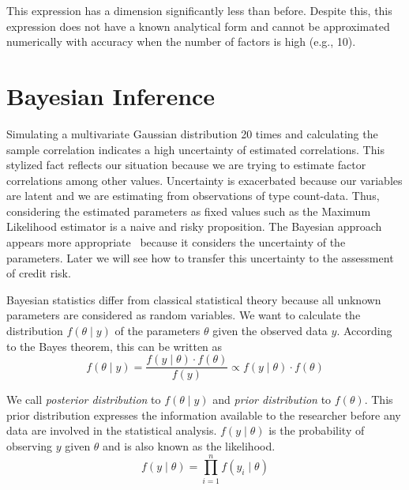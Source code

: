 \documentclass[11pt,fleqn]{book} %
\begin{document}
This expression has a dimension significantly less than before. Despite 
this, this expression does not have a known analytical form and cannot 
be approximated numerically with accuracy when the number of factors is 
high (e.g., 10).


\section{Bayesian Inference}

Simulating a multivariate Gaussian distribution 20 times and calculating 
the sample correlation indicates a high uncertainty of estimated correlations. 
This stylized fact reflects our situation because we are trying to estimate 
factor correlations among other values. Uncertainty is exacerbated because 
our variables are latent and we are estimating from observations of type 
count-data. Thus, considering the estimated parameters as fixed values such 
as the Maximum Likelihood estimator is a naive and risky proposition. 
The Bayesian approach appears more appropriate~\cite{gossl:2005,tarashev:2010}
because it considers the uncertainty of the parameters. Later we will see 
how to transfer this uncertainty to the assessment of credit risk.

Bayesian statistics differ from classical statistical theory because all 
unknown parameters are considered as random variables. We want to calculate 
the distribution $f(\theta \mid y)$ of the parameters $\theta$ given the 
observed data $y$. According to the Bayes theorem, this can be written as
\begin{displaymath}
	f(\theta \mid y) = \frac{f(y \mid \theta) \cdot f(\theta)}{f(y)} \propto f(y \mid \theta) \cdot f(\theta)
\end{displaymath}

We call \emph{posterior distribution} to $f(\theta \mid y)$ and 
\emph{prior distribution} to $f(\theta)$. This prior distribution 
expresses the information available to the researcher before 
any data are involved in the statistical analysis. $f(y \mid \theta)$ 
is the probability of observing $y$ given $\theta$ and is also 
known as the likelihood.
\begin{displaymath}
	f(y \mid \theta) = \prod_{i=1}^n f(y_i \mid \theta)
\end{displaymath}
\end{document}
